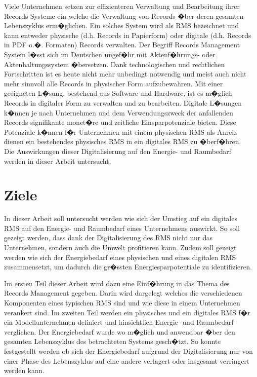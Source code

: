 \documentclass[a4paper,twoside,10pt]{report}
\begin{document}
Viele Unternehmen setzen zur effizienteren Verwaltung und Bearbeitung ihrer Records Systeme ein welche die Verwaltung von Records �ber deren gesamten Lebenszyklus erm�glichen. Ein solches System wird als \ac{RMS} bezeichnet und kann entweder physische (d.h. Records in Papierform) oder digitale (d.h. Records in PDF o.�. Formaten) Records verwalten. Der Begriff Records Management System l�sst sich im Deutschen ungef�hr mit Aktenf�hrungs- oder Aktenhaltungssystem �bersetzen.
Dank technologischen und rechtlichen Fortschritten ist es heute nicht mehr unbedingt notwendig und meist auch nicht mehr sinnvoll alle Records in physischer Form aufzubewahren. Mit einer geeigneten L�sung, bestehend aus Software und Hardware, ist es m�glich Records in digitaler Form zu verwalten und zu bearbeiten. Digitale L�sungen k�nnen je nach Unternehmen und dem Verwendungszweck der anfallenden Records signifikante monet�re und zeitliche Einsparpotenziale bieten. Diese Potenziale k�nnen f�r Unternehmen mit einem physischen \ac{RMS} als Anreiz dienen ein bestehendes physisches \ac{RMS} in ein digitales \ac{RMS} zu �berf�hren. Die Auswirkungen dieser Digitalisierung auf den Energie- und Raumbedarf werden in dieser Arbeit untersucht.

\section{Ziele}
In dieser Arbeit soll untersucht werden wie sich der Umstieg auf ein digitales \ac{RMS} auf den Energie- und Raumbedarf eines Unternehmens auswirkt. So soll gezeigt werden, dass dank der Digitalisierung des \ac{RMS} nicht nur das Unternehmen, sondern auch die Umwelt profitieren kann. Zudem soll gezeigt werden wie sich der Energiebedarf eines physischen und eines digitalen \ac{RMS} zusammensetzt, um dadurch die gr�ssten Energiesparpotentiale zu identifizieren. 

Im ersten Teil dieser Arbeit wird dazu eine Einf�hrung in das Thema des Records Management gegeben. Darin wird dargelegt welches die verschiedenen Komponenten eines typischen \ac{RMS} sind und wie diese in einem Unternehmen verankert sind. Im zweiten Teil werden ein physisches und ein digitales \ac{RMS} f�r ein Modellunternehmen definiert und hinsichtlich Energie- und Raumbedarf verglichen. Der Energiebedarf wurde wo m�glich und anwendbar �ber den gesamten Lebenszyklus des betrachteten Systems gesch�tzt. So konnte festgestellt werden ob sich der Energiebedarf aufgrund der Digitalisierung nur von einer Phase des Lebenszyklus auf eine andere verlagert oder insgesamt verringert werden kann. 
\end{document}
